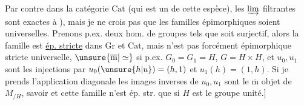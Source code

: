 Par contre dans la catégorie $\mathrm{Cat}$ (qui est un  de cette espèce), les $\varinjlim$ filtrantes sont exactes à ), mais je ne crois pas que les familles épimorphiques  soient universelles. Prenons p.ex. deux hom. de groupes
tels que
soit surjectif, alors la famille  est \uline{ép. stricte} dans $\mathrm{Gr}$ et $\mathrm{Cat}$, mais n'est pas  forcément épimorphique stricte universelle, $\unsure{\overline{\mathrm{m}}|\simeq}$ si
p.ex. $G_0=G_1=H$, $G=H\times H$, et $u_0,u_1$ sont les injections
 par $u_0(\unsure{h|u})=(h,1)$ et $u_1(h)=(1,h)$. Si je prends l'application diagonale
les images inverses de $u_0,u_1$ sont le $\overline{\mathrm{m}}$ objet de $M_{/H}$, savoir
et cette  famille n'est ép. str. que si $H$ est le groupe unité.]

